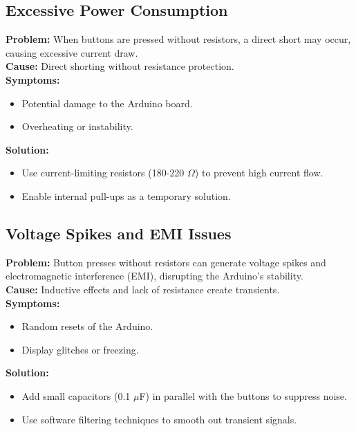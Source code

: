 \documentclass[journal]{IEEEtran}
\begin{document}
\subsection*{Excessive Power Consumption}
\textbf{Problem:} When buttons are pressed without resistors, a direct short may occur, causing excessive current draw. \\
\textbf{Cause:} Direct shorting without resistance protection. \\
\textbf{Symptoms:}
\begin{itemize}
    \item Potential damage to the Arduino board.
    \item Overheating or instability.
\end{itemize}
\textbf{Solution:}
\begin{itemize}
    \item Use current-limiting resistors (180-220 $\Omega$) to prevent high current flow.
    \item Enable internal pull-ups as a temporary solution.
\end{itemize}

\subsection*{Voltage Spikes and EMI Issues}
\textbf{Problem:} Button presses without resistors can generate voltage spikes and electromagnetic interference (EMI), disrupting the Arduino's stability. \\
\textbf{Cause:} Inductive effects and lack of resistance create transients. \\
\textbf{Symptoms:}
\begin{itemize}
    \item Random resets of the Arduino.
    \item Display glitches or freezing.
\end{itemize}
\textbf{Solution:}
\begin{itemize}
    \item Add small capacitors (0.1 $\mu$F) in parallel with the buttons to suppress noise.
    \item Use software filtering techniques to smooth out transient signals.
\end{itemize}
\end{document}
